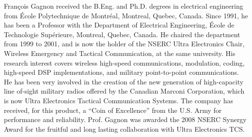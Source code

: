 \documentclass[journal]{IEEEtran}
\theoremstyle{definition}
\begin{document}
\begin{IEEEbiography}{Fran\c{c}ois Gagnon}
received the B.Eng. and Ph.D. degrees in electrical engineering from  \'{E}cole Polytechnique de Montr\'{e}al, Montreal, Quebec, Canada. Since 1991, he has been a Professor with the Department of Electrical Engineering,  \'{E}cole de Technologie Sup\'{e}rieure, Montreal, Quebec, Canada. He chaired the department from 1999 to 2001, and is now the holder of the NSERC Ultra Electronics Chair, Wireless Emergency and Tactical Communication, at the same university. His research interest covers wireless high-speed communications, modulation, coding, high-speed DSP implementations, and military point-to-point communications. He has been very involved in the creation of the new generation of high-capacity line of-sight military radios offered by the Canadian Marconi Corporation, which is now Ultra Electronics Tactical Communication Systems. The company has received, for this product, a “Coin of Excellence” from the U.S. Army for performance and reliability. Prof. Gagnon was awarded the 2008 NSERC Synergy Award for the fruitful and long lasting collaboration with Ultra Electronics TCS.
\end{IEEEbiography}
\vfill
\end{document}

